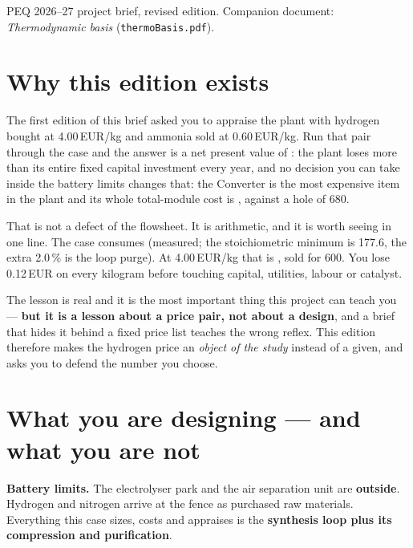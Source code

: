 \documentclass[11pt,a4paper]{article}
\begin{document}
          {PEQ 2026--27 project brief, revised edition. Companion document:
           \emph{Thermodynamic basis} (\texttt{thermoBasis.pdf}).}

\section*{Why this edition exists}

The first edition of this brief asked you to appraise the plant with hydrogen
bought at 4.00\,EUR/kg and ammonia sold at 0.60\,EUR/kg. Run that pair through
the case and the answer is a net present value of
: the plant loses more than its entire fixed
capital investment every year, and no decision you can take inside the battery
limits changes that: the Converter is the most expensive item in the plant and
its whole total-module cost is , against a hole of
680.

That is not a defect of the flowsheet. It is arithmetic, and it is worth seeing
in one line. The case consumes  (measured; the stoichiometric minimum is 177.6, the extra 2.0\,\% is
the loop purge). At 4.00\,EUR/kg that is , sold for 600. You lose 0.12\,EUR on every kilogram
before touching capital, utilities, labour or catalyst.

The lesson is real and it is the most important thing this project can teach
you --- \textbf{but it is a lesson about a price pair, not about a design}, and
a brief that hides it behind a fixed price list teaches the wrong reflex. This
edition therefore makes the hydrogen price an \emph{object of the study}
instead of a given, and asks you to defend the number you choose.

\section{What you are designing --- and what you are not}

\begin{caveat}
\textbf{Battery limits.} The electrolyser park and the air separation unit are
\textbf{outside}. Hydrogen and nitrogen arrive at the fence as purchased raw
materials. Everything this case sizes, costs and appraises is the
\textbf{synthesis loop plus its compression and purification}.
\end{caveat}
\end{document}
